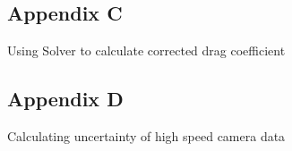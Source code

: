 \documentclass[12pt]{report}
\begin{document}
\newpage
\subsection*{Appendix C}
\noindent Using Solver to calculate corrected drag coefficient

\begin{figure*}[h!]
	\centering
	\label{fig:excelsolver}
\end{figure*}
\begin{figure*}[h!]
	\centering
	\label{fig:excelsolver2}
\end{figure*}

\newpage
\subsection*{Appendix D}
\noindent Calculating uncertainty of high speed camera data

\begin{figure*}[h!]
	\centering
	\label{fig:hsdata}
\end{figure*}
\end{document}
